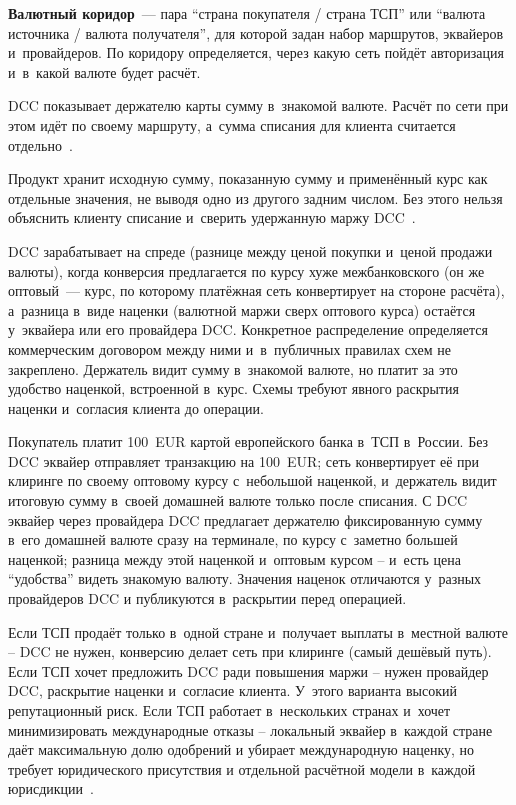 \textbf{Валютный коридор}~--- пара \enquote{страна покупателя
/ страна ТСП} или \enquote{валюта источника / валюта
получателя}, для которой задан набор маршрутов, эквайеров
и~провайдеров. По коридору определяется, через какую сеть
пойдёт авторизация и~в~какой валюте будет расчёт.

DCC показывает держателю карты сумму в~знакомой валюте.
Расчёт по сети при этом идёт по своему маршруту, а~сумма
списания для клиента считается отдельно~\cite{visa-core-rules,mc-tpr}.

Продукт хранит исходную сумму, показанную сумму и применённый
курс как отдельные значения, не выводя одно из другого
задним числом. Без этого нельзя объяснить клиенту
списание и~сверить удержанную маржу DCC~\cite{visa-core-rules,mc-tpr}.

DCC зарабатывает на спреде (разнице между ценой покупки
и~ценой продажи валюты), когда конверсия предлагается по курсу
хуже межбанковского (он же оптовый~--- курс, по которому
платёжная сеть конвертирует на стороне расчёта),
а~разница в~виде наценки (валютной маржи сверх оптового
курса) остаётся у~эквайера или его провайдера DCC. Конкретное распределение определяется
коммерческим договором между ними и~в~публичных правилах схем
не закреплено. Держатель видит сумму в~знакомой
валюте, но платит за это удобство наценкой, встроенной
в~курс. Схемы требуют явного раскрытия наценки и~согласия
клиента до операции.

Покупатель платит 100~EUR картой европейского банка в~ТСП в~России. Без DCC эквайер
отправляет транзакцию на 100~EUR; сеть
конвертирует её при клиринге по своему оптовому курсу
с~небольшой наценкой, и~держатель видит итоговую сумму
в~своей домашней валюте только после списания. С DCC эквайер
через провайдера DCC предлагает держателю фиксированную
сумму в~его домашней валюте сразу на терминале, по курсу
с~заметно большей наценкой; разница между этой наценкой
и~оптовым курсом -- и~есть цена \enquote{удобства} видеть знакомую
валюту. Значения наценок отличаются у~разных
провайдеров DCC и публикуются в~раскрытии перед операцией.

Если ТСП продаёт только в~одной стране и~получает выплаты
в~местной валюте -- DCC не нужен, конверсию делает сеть
при клиринге (самый дешёвый путь). Если ТСП хочет предложить DCC ради
повышения маржи -- нужен провайдер DCC, раскрытие наценки
и~согласие клиента. У~этого варианта высокий репутационный риск. Если ТСП
работает в~нескольких странах и~хочет минимизировать
международные отказы -- локальный эквайер в~каждой стране
даёт максимальную долю одобрений и убирает международную
наценку, но требует юридического присутствия и отдельной
расчётной модели в~каждой юрисдикции~\cite{visa-core-rules,mc-tpr}.

